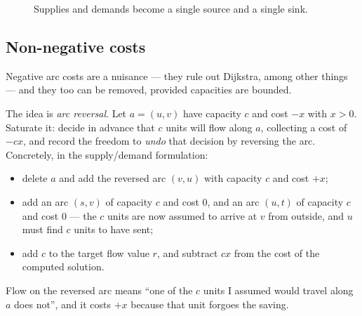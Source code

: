 \begin{figure}[ht]
\centering
{}
\caption{Supplies and demands become a single source and a single sink.}
\label{fig:mcf-demands}
\end{figure}

\subsection{Non-negative costs}
\label{sec:mcf-nonnegative-costs}

Negative arc costs are a nuisance --- they rule out Dijkstra, among other
things --- and they too can be removed, provided capacities are bounded.

The idea is \emph{arc reversal}. Let $a = (u,v)$ have capacity $c$ and cost
$-x$ with $x > 0$. Saturate it: decide in advance that $c$ units will flow along
$a$, collecting a cost of $-cx$, and record the freedom to \emph{undo} that
decision by reversing the arc. Concretely, in the supply/demand formulation:
\begin{itemize}[nosep]
  \item delete $a$ and add the reversed arc $(v,u)$ with capacity $c$ and cost
        $+x$;
  \item add an arc $(s,v)$ of capacity $c$ and cost $0$, and an arc $(u,t)$ of
        capacity $c$ and cost $0$ --- the $c$ units are now assumed to arrive
        at $v$ from outside, and $u$ must find $c$ units to have sent;
  \item add $c$ to the target flow value $r$, and subtract $cx$ from the cost
        of the computed solution.
\end{itemize}
Flow on the reversed arc means ``one of the $c$ units I assumed would travel
along $a$ does not'', and it costs $+x$ because that unit forgoes the saving.

